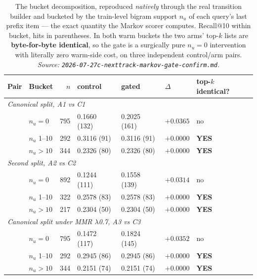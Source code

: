 \documentclass[11pt]{article}
\newcommand{\best}[1]{\textbf{#1}}
\begin{document}
\begin{table}[ht]
  \centering
  \caption{The bucket decomposition, reproduced \emph{natively} through the real
  transition builder and bucketed by the train-level bigram support $n_u$ of each
  query's last prefix item --- the exact quantity the Markov scorer computes.
  Recall@10 within bucket, hits in parentheses. In both warm buckets the two arms'
  top-$k$ lists are \textbf{byte-for-byte identical}, so the gate is a surgically
  pure $n_u=0$ intervention with literally zero warm-side cost, on three
  independent control/arm pairs.
  \emph{Source: \texttt{2026-07-27c-nexttrack-markov-gate-confirm.md}.}}
  \label{tab:nexttrack-markovgate-buckets}
  {\footnotesize\setlength{\tabcolsep}{5pt}\begin{tabular}{llrllll}
    \toprule
    Pair & Bucket & $n$ & control & gated & $\Delta$ & top-$k$ identical? \\
    \midrule
    \multicolumn{7}{l}{\emph{Canonical split, A1 vs C1}} \\
    & $n_u = 0$ & 795 & 0.1660 (132) & 0.2025 (161) & \best{$+0.0365$} & no \\
    & $n_u$ 1--10 & 292 & 0.3116 (91) & 0.3116 (91) & $+0.0000$ & \best{YES} \\
    & $n_u > 10$ & 344 & 0.2326 (80) & 0.2326 (80) & $+0.0000$ & \best{YES} \\
    \midrule
    \multicolumn{7}{l}{\emph{Second split, A2 vs C2}} \\
    & $n_u = 0$ & 892 & 0.1244 (111) & 0.1558 (139) & \best{$+0.0314$} & no \\
    & $n_u$ 1--10 & 322 & 0.2578 (83) & 0.2578 (83) & $+0.0000$ & \best{YES} \\
    & $n_u > 10$ & 217 & 0.2304 (50) & 0.2304 (50) & $+0.0000$ & \best{YES} \\
    \midrule
    \multicolumn{7}{l}{\emph{Canonical split under MMR $\lambda$0.7, A3 vs C3}} \\
    & $n_u = 0$ & 795 & 0.1472 (117) & 0.1824 (145) & \best{$+0.0352$} & no \\
    & $n_u$ 1--10 & 292 & 0.2945 (86) & 0.2945 (86) & $+0.0000$ & \best{YES} \\
    & $n_u > 10$ & 344 & 0.2151 (74) & 0.2151 (74) & $+0.0000$ & \best{YES} \\
    \bottomrule
  \end{tabular}}
\end{table}
\end{document}
